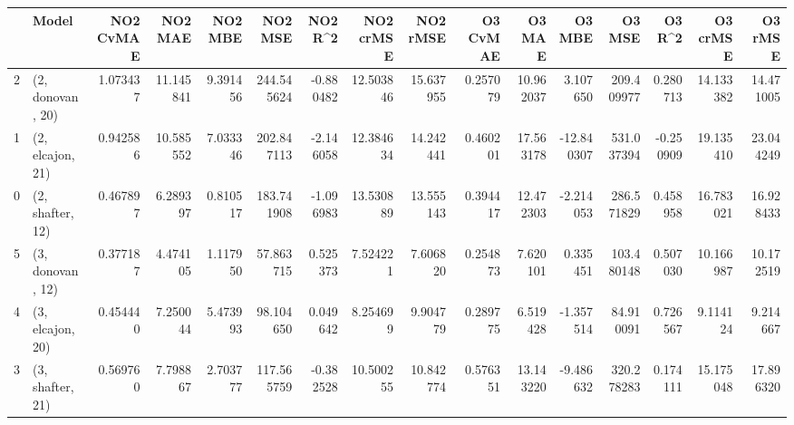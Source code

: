 \begin{tabular}{llrrrrrrrrrrrrrr}
\toprule
{} &             Model &  NO2 CvMAE &    NO2 MAE &   NO2 MBE &     NO2 MSE &   NO2 R\textasciicircum2 &  NO2 crMSE &   NO2 rMSE &  O3 CvMAE &     O3 MAE &     O3 MBE &      O3 MSE &    O3 R\textasciicircum2 &   O3 crMSE &    O3 rMSE \\
\midrule
2 &  (2, donovan, 20) &   1.073437 &  11.145841 &  9.391456 &  244.545624 & -0.880482 &  12.503846 &  15.637955 &  0.257079 &  10.962037 &   3.107650 &  209.409977 &  0.280713 &  14.133382 &  14.471005 \\
1 &  (2, elcajon, 21) &   0.942586 &  10.585552 &  7.033346 &  202.847113 & -2.146058 &  12.384634 &  14.242441 &  0.460201 &  17.563178 & -12.840307 &  531.037394 & -0.250909 &  19.135410 &  23.044249 \\
0 &  (2, shafter, 12) &   0.467897 &   6.289397 &  0.810517 &  183.741908 & -1.096983 &  13.530889 &  13.555143 &  0.394417 &  12.472303 &  -2.214053 &  286.571829 &  0.458958 &  16.783021 &  16.928433 \\
5 &  (3, donovan, 12) &   0.377187 &   4.474105 &  1.117950 &   57.863715 &  0.525373 &   7.524221 &   7.606820 &  0.254873 &   7.620101 &   0.335451 &  103.480148 &  0.507030 &  10.166987 &  10.172519 \\
4 &  (3, elcajon, 20) &   0.454440 &   7.250044 &  5.473993 &   98.104650 &  0.049642 &   8.254699 &   9.904779 &  0.289775 &   6.519428 &  -1.357514 &   84.910091 &  0.726567 &   9.114124 &   9.214667 \\
3 &  (3, shafter, 21) &   0.569760 &   7.798867 &  2.703777 &  117.565759 & -0.382528 &  10.500255 &  10.842774 &  0.576351 &  13.143220 &  -9.486632 &  320.278283 &  0.174111 &  15.175048 &  17.896320 \\
\bottomrule
\end{tabular}
